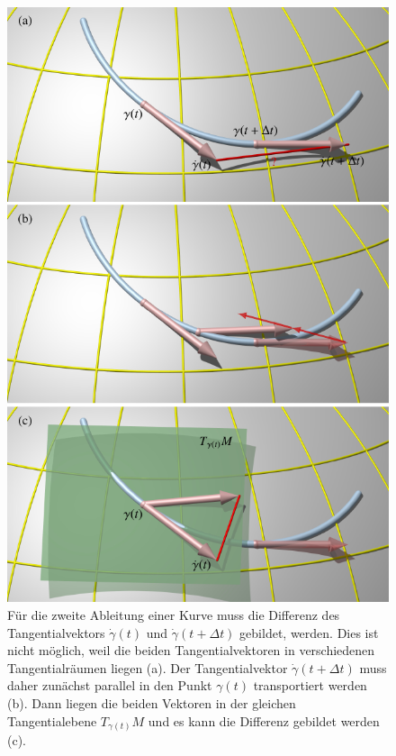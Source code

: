 %
%
%
\begin{figure}
\centering
\includegraphics{chapters/100-zusammenhang/images/differenz.pdf}
\caption{Für die zweite Ableitung einer Kurve muss die Differenz
des Tangentialvektors $\dot{\gamma}(t)$ und $\dot{\gamma}(t+\Delta t)$
gebildet, werden.
Dies ist nicht möglich, weil die beiden Tangentialvektoren in 
verschiedenen Tangentialräumen liegen (a).
Der Tangentialvektor $\dot{\gamma}(t+\Delta t)$ muss daher zunächst
parallel in den Punkt $\gamma(t)$ transportiert werden (b).
Dann liegen die beiden Vektoren in der gleichen Tangentialebene
$T_{\gamma(t)}M$ und es kann die Differenz gebildet werden (c).
\label{buch:zusammenhang:fig:differenz}}
\end{figure}

